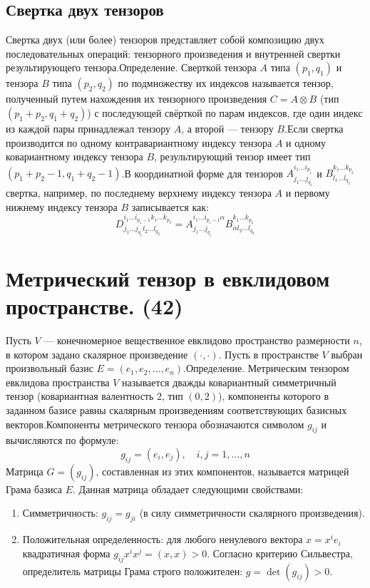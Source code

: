 \documentclass[14pt]{extreport}
\begin{document}
    \section{Свертка двух тензоров}
    Свертка двух (или более) тензоров представляет собой композицию двух последовательных операций: тензорного произведения и внутренней свертки результирующего тензора.Определение. Сверткой тензора $A$ типа $(p_1, q_1)$ и тензора $B$ типа $(p_2, q_2)$ по подмножеству их индексов называется тензор, полученный путем нахождения их тензорного произведения $C = A \otimes B$ (тип $(p_1+p_2, q_1+q_2)$) с последующей свёрткой по парам индексов, где один индекс из каждой пары принадлежал тензору $A$, а второй — тензору $B$.Если свертка производится по одному контравариантному индексу тензора $A$ и одному ковариантному индексу тензора $B$, результирующий тензор имеет тип $(p_1+p_2-1, q_1+q_2-1)$.В координатной форме для тензоров $A^{i_1 \dots i_{p_1}}_{j_1 \dots j_{q_1}}$ и $B^{k_1 \dots k_{p_2}}_{l_1 \dots l_{q_2}}$ свертка, например, по последнему верхнему индексу тензора $A$ и первому нижнему индексу тензора $B$ записывается как:$$D^{i_1 \dots i_{p_1-1} k_1 \dots k_{p_2}}_{j_1 \dots j_{q_1} l_2 \dots l_{q_2}} = A^{i_1 \dots i_{p_1-1} \alpha}_{j_1 \dots j_{q_1}} B^{k_1 \dots k_{p_2}}_{\alpha l_2 \dots l_{q_2}}$$

    \chapter{Метрический тензор в евклидовом пространстве. (42)}
    \begin{defbox}
        Пусть $V$ — конечномерное вещественное евклидово пространство размерности $n$, в котором задано скалярное произведение $(\cdot, \cdot)$. Пусть в пространстве $V$ выбран произвольный базис $E = (e_1, e_2, \dots, e_n)$.Определение. Метрическим тензором евклидова пространства $V$ называется дважды ковариантный симметричный тензор (ковариантная валентность $2$, тип $(0,2)$), компоненты которого в заданном базисе равны скалярным произведениям соответствующих базисных векторов.Компоненты метрического тензора обозначаются символом $g_{ij}$ и вычисляются по формуле:$$g_{ij} = (e_i, e_j), \quad i, j = 1, \dots, n$$Матрица $G = (g_{ij})$, составленная из этих компонентов, называется матрицей Грама базиса $E$. Данная матрица обладает следующими свойствами:

        \begin{enumerate}
            \item Симметричность: $g_{ij} = g_{ji}$ (в силу симметричности скалярного произведения).
            \item Положительная определенность: для любого ненулевого вектора $x = x^i e_i$ квадратичная форма $g_{ij} x^i x^j = (x, x) > 0$. Согласно критерию Сильвестра, определитель матрицы Грама строго положителен: $g = \det(g_{ij}) > 0$.
        \end{enumerate}
    \end{defbox}
\end{document}
